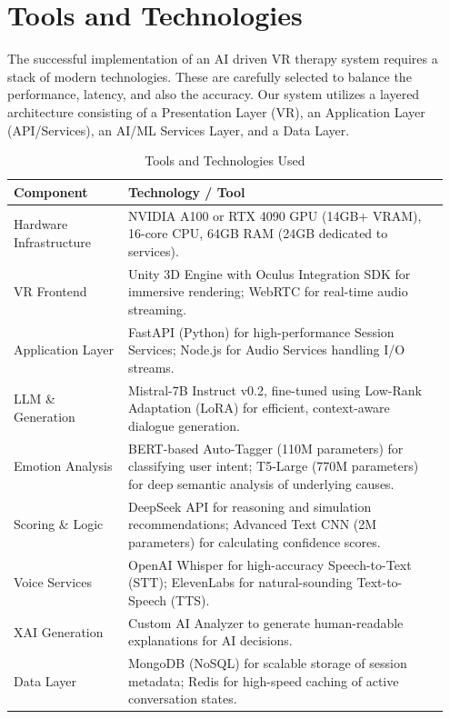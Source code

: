 \section{Tools and Technologies}

The successful implementation of an AI driven VR therapy system requires a stack of modern technologies. These are carefully selected to balance the performance, latency, and also the accuracy. Our system utilizes a layered architecture consisting of a Presentation Layer (VR), an Application Layer (API/Services), an AI/ML Services Layer, and a Data Layer.

\begin{table}[H]
\centering
\small
\renewcommand{\arraystretch}{1.3}
\caption{Tools and Technologies Used}
\label{tab:tools}
\begin{tabular}{@{} p{0.25\linewidth} p{0.7\linewidth} @{}}
\toprule
\rowcolor{gray!20} \textbf{Component} & \textbf{Technology / Tool} \\
\midrule
Hardware Infrastructure & NVIDIA A100 or RTX 4090 GPU (14GB+ VRAM), 16-core CPU, 64GB RAM (24GB dedicated to services). \\
VR Frontend & Unity 3D Engine with Oculus Integration SDK for immersive rendering; WebRTC for real-time audio streaming. \\
Application Layer & FastAPI (Python) for high-performance Session Services; Node.js for Audio Services handling I/O streams. \\
LLM \& Generation & Mistral-7B Instruct v0.2, fine-tuned using Low-Rank Adaptation (LoRA) for efficient, context-aware dialogue generation. \\
Emotion Analysis & BERT-based Auto-Tagger (110M parameters) for classifying user intent; T5-Large (770M parameters) for deep semantic analysis of underlying causes. \\
Scoring \& Logic & DeepSeek API for reasoning and simulation recommendations; Advanced Text CNN (2M parameters) for calculating confidence scores. \\
Voice Services & OpenAI Whisper for high-accuracy Speech-to-Text (STT); ElevenLabs for natural-sounding Text-to-Speech (TTS). \\
XAI Generation & Custom AI Analyzer to generate human-readable explanations for AI decisions. \\
Data Layer & MongoDB (NoSQL) for scalable storage of session metadata; Redis for high-speed caching of active conversation states. \\
\bottomrule
\end{tabular}
\end{table}

